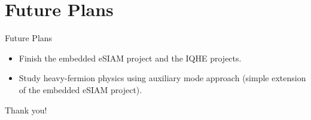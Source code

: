 \documentclass[12pt,aspectratio=169]{beamer}
\begin{document}
\section{Future Plans}

\begin{frame}{Future Plans}
	\begin{itemize}
		\item Finish the embedded eSIAM project and the IQHE projects.
		\item Study heavy-fermion physics using auxiliary mode approach (simple extension of the embedded eSIAM project).
	\end{itemize}
	\vspace{\fill}
	\Large{Thank you!}
\end{frame}
\end{document}
